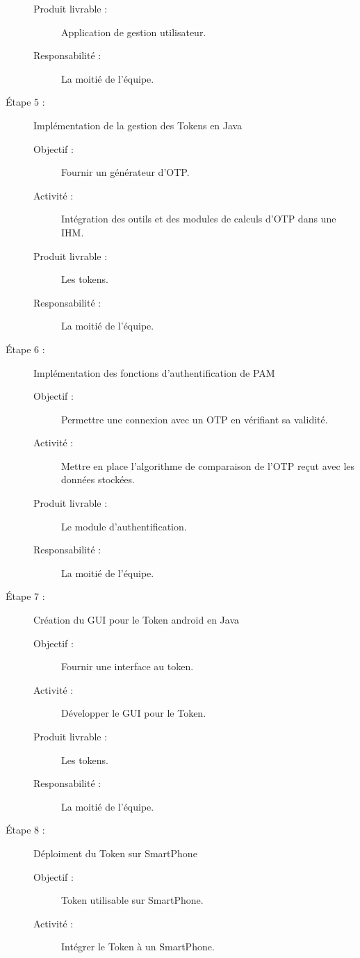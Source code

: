 \documentclass{../../res/univ-projet}
\begin{document}
\begin{description}
\begin{description}
		        \item [Produit livrable :] Application de gestion utilisateur.
		        \item [Responsabilité :] La moitié de l'équipe.
		    \end{description}
	    \item [Étape 5 :] Implémentation de la gestion des Tokens en Java
		    \begin{description}
		        \item [Objectif :] Fournir un générateur d'OTP.
		        \item [Activité :] Intégration des outils et des modules de calculs d'OTP dans une IHM.
		        \item [Produit livrable :] Les tokens.
		        \item [Responsabilité :] La moitié de l'équipe.
		    \end{description}
	    \item [Étape 6 :] Implémentation des fonctions d'authentification de PAM
		    \begin{description}
		        \item [Objectif :] Permettre une connexion avec un OTP en vérifiant sa validité.
		        \item [Activité :] Mettre en place l'algorithme de comparaison de l'OTP reçut avec les données stockées.
		        \item [Produit livrable :] Le module d'authentification.
		        \item [Responsabilité :] La moitié de l'équipe.
	            \end{description}
	    \item [Étape 7 :] Création du GUI pour le Token android en Java
		    \begin{description}
		        \item [Objectif :] Fournir une interface au token.
		        \item [Activité :] Développer le GUI pour le Token.
		        \item [Produit livrable :] Les tokens.
		        \item [Responsabilité :] La moitié de l'équipe.
		    \end{description}
	    \item [Étape 8 :] Déploiment du Token sur SmartPhone
		    \begin{description}
		        \item [Objectif :] Token utilisable sur SmartPhone.
		        \item [Activité :] Intégrer le Token à un SmartPhone.

\end{description}
\end{description}
\end{document}

